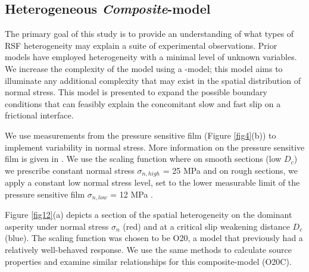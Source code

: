 \documentclass[preprint,1p, 10pt,authoryear]{elsarticle}
\begin{document}
\subsection{Heterogeneous \textit{Composite}-model}
The primary goal of this study is to provide an understanding of what types of RSF heterogeneity may explain a suite of experimental observations. Prior models have employed heterogeneity with a minimal level of unknown variables. We increase the complexity of the model using a -model; this model aims to illuminate any additional complexity that may exist in the spatial distribution of normal stress. This model is presented to expand the possible boundary conditions that can feasibly explain the concomitant slow and fast slip on a frictional interface. 

We use measurements from the pressure sensitive film (Figure \ref{fig4}(b)) to implement variability in normal stress. More information on the pressure sensitive film is given in \citet{Selvadurai2017}. We use the scaling function where on smooth sections (low $D_{c}$) we prescribe constant normal stress $\sigma_{n, high}$ = 25 MPa and on rough sections, we apply a constant low normal stress level, set to the lower measurable limit of the pressure sensitive film $\sigma_{n, low}$ = 12 MPa \citep{Selvadurai2015a}. 

Figure \ref{fig12}(a) depicts a section of the spatial heterogeneity on the dominant asperity under normal stress $\sigma_{n}$ (red) and at a critical slip weakening distance $D_{c}$ (blue).  The scaling function was chosen to be O20, a model that previously had a relatively well-behaved response.  We use the same methods to calculate source properties and examine similar relationships for this composite-model (O20C).
\end{document}
